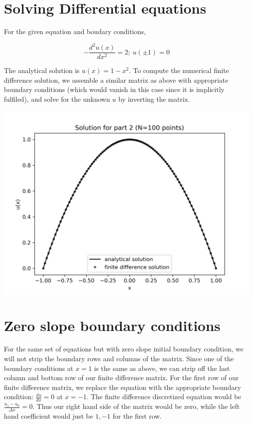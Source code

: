 \documentclass{article}
\begin{document}
\section{Solving Differential equations}
For the given equation and boudary conditions,

\[ -\frac{d^2u(x)}{dx^2} = 2;\  u(\pm 1) = 0 \]

The analytical solution is $u(x) = 1 - x^2$. To compute the numerical finite difference solution, we assemble a similar matrix as above with appropriate boundary conditions (which would vanish in this case since it is implicitly fulfiled), and solve for the unknown $u$ by inverting the matrix.
        
\includegraphics[scale=0.8]{part2.png}

\section{Zero slope boundary conditions}

For the same set of equations but with zero slope initial boundary condition, we will not strip the boundary rows and columns of the matrix. Since one of the boundary conditions at $x = 1$ is the same as above, we can strip off the last column and bottom row of our finite difference matrix. For the first row of our finite difference matrix, we replace the equation with the appropriate boundary condition: $\frac{du}{dx} = 0$ at $x = -1$. The finite difference discretized equation would be $\frac{u_1 - u_0}{\Delta x} = 0$. Thus our right hand side of the matrix would be zero, while the left hand coefficient would just be $1, -1$ for the first row.
    
\end{document}

